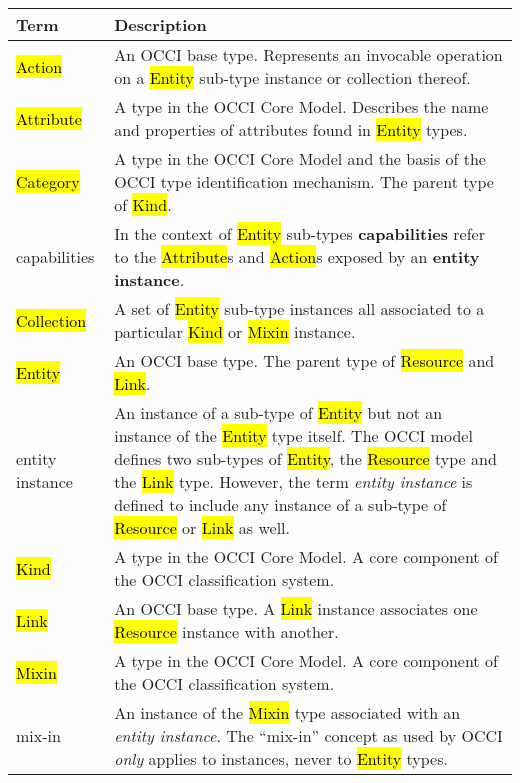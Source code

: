 \begin{tabular}{l|p{12cm}}
Term & Description \\
\hline
\hl{Action} & An OCCI base type. Represents an invocable operation on a \hl{Entity} sub-type instance or collection thereof. \\

\hl{Attribute} & A type in the OCCI Core Model. Describes the name and properties of attributes found in \hl{Entity} types. \\

\hl{Category} & A type in the OCCI Core Model and the basis of the OCCI type identification mechanism. The parent type of \hl{Kind}. \\

capabilities & In the context of \hl{Entity} sub-types {\bf  capabilities} refer
  to the \hl{Attribute}s and \hl{Action}s exposed by an {\bf entity
  instance}. \\

\hl{Collection} & A set of \hl{Entity} sub-type instances all associated to a particular \hl{Kind} or \hl{Mixin} instance. \\

\hl{Entity} & An OCCI base type. The parent type of \hl{Resource} and \hl{Link}. \\

entity instance & An instance of a sub-type of \hl{Entity} but not an instance
  of the \hl{Entity} type itself.  The OCCI model defines two sub-types of
  \hl{Entity}, the \hl{Resource} type and the \hl{Link} type.  However, the
  term {\em entity instance} is defined to include any instance of a
  sub-type of \hl{Resource} or \hl{Link} as well. \\

\hl{Kind} & A type in the OCCI Core Model. A core component of the OCCI classification system. \\

\hl{Link} & An OCCI base type. A \hl{Link} instance associates one \hl{Resource} instance with another. \\

\hl{Mixin} & A type in the OCCI Core Model. A core component of the OCCI classification system. \\

mix-in & An instance of the \hl{Mixin} type associated with an {\em entity
 instance}. The ``mix-in'' concept as used by OCCI {\em only} applies to
 instances, never to \hl{Entity} types. \\


\end{tabular}
